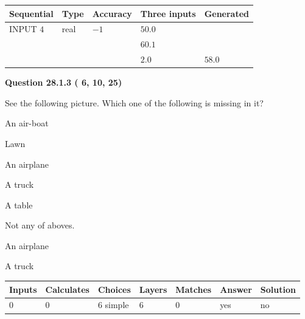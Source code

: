 \documentclass[12pt]{article}
\begin{document}
   
  
  
\noindent\begin{tabular}{|l|l|l|l|l|}
\hline
 Sequential & Type & Accuracy & Three inputs & Generated \\ 
\hline
 
 
  INPUT $           4$ & real & $          -1 $ & $
 50.0
  $ & \\
  & & &  $
 60.1
  $ & \\
  & & &  $
 2.0
 $ & $ 58.0 $ 
 \\  \hline  
 \end{tabular}
   
   
  
\vspace{0.2in}
  
{\textbf{\Large{Question
28.1.3 
 (          6,         10,         25)
}}}
  
  
See the following picture.
Which one of the following is missing in it?
 
 
An air-boat
 
 
Lawn
 
 
An airplane
 
 
A truck
 
 
A table
 
 
  Not any of aboves.
 
 
\noindent{}
 
 
An airplane
 
 
A truck
 
 
\noindent{}
 
 
 
\vspace{0.3in}
   
   
   
   
\noindent\begin{tabular}{|l|l|l|l|l|l|l|}
 \hline
Inputs & Calculates & Choices & Layers & Matches & Answer & Solution \\ \hline
           0 & 
           0 & 
           6
  simple  
  & 
           6 & 
           0 & 
  yes & 
  no 
  \\ \hline
 \end{tabular}
   
\end{document}
